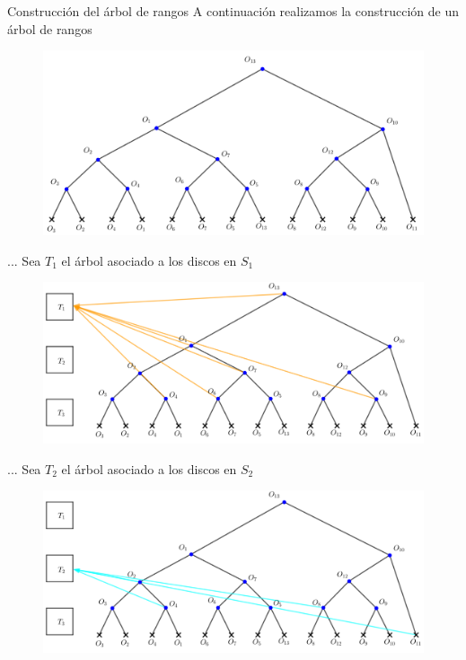 \begin{frame}{Construcción del árbol de rangos}
  A continuación realizamos la construcción de un árbol de rangos

  \begin{figure}  
    \centering
    \includegraphics[width=1\textwidth]{./Images/Range1.png}
  \end{figure}
\end{frame}


\begin{frame}{...}
  Sea $T_1$ el árbol asociado a los discos en $S_1$

  \begin{figure}  
    \centering
    \includegraphics[width=1\textwidth]{./Images/Range2.png}
  \end{figure}
\end{frame}

\begin{frame}{...}
  Sea $T_2$ el árbol asociado a los discos en $S_2$

  \begin{figure}  
    \centering
    \includegraphics[width=1\textwidth]{./Images/Range3.png}
  \end{figure}
\end{frame}

